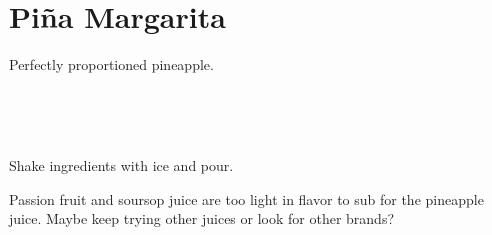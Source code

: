 \section[Pi\~{n}a Margarita]{
    Pi\~{n}a Margarita
}

\begin{recipestats}[
        servings=1,
        preptime=5 \minute,
        original=\citefield{cointreauPineapple}{shorttitle}~\cite{cointreauPineapple},
    ]
\end{recipestats}

\begin{recipeabstract}
    Perfectly proportioned pineapple.
\end{recipeabstract}

\begin{ingredientcolumns}
    \begin{ingredientblock}
        \\
    \end{ingredientblock}
    \begin{ingredientblock}
        \\
    \end{ingredientblock}
\end{ingredientcolumns}

\begin{preparation}
\item Shake ingredients with ice and pour.
\end{preparation}

\begin{experiments}
\item Passion fruit and soursop juice are too light in flavor to sub for the
    pineapple juice.
    Maybe keep trying other juices or look for other brands?
\end{experiments}

\recipeend%

